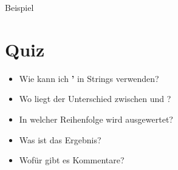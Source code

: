 	\begin{frame}
		\slidehead
		\begin{block}{Beispiel}
		\end{block}
	\end{frame}

	\livecoding

	\section{Quiz}
	\begin{frame}
		\slidehead

		\begin{itemize}
			\item Wie kann ich \textbf{'} in Strings verwenden?
			\pause
			\item Wo liegt der Unterschied zwischen  und \pythoninline{float}?
			\pause
			\item In welcher Reihenfolge wird  ausgewertet?
			\pause
			\item Was ist das Ergebnis?
			\pause
			\item Wofür gibt es Kommentare?
		\end{itemize}
	\end{frame}

	
